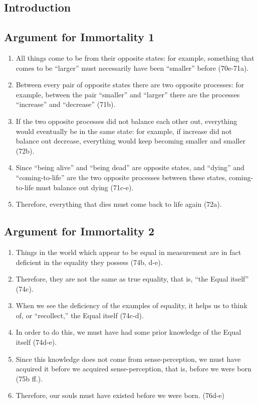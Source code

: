 \documentclass[oneside]{article}
\begin{document}
\thispagestyle{fancy}

\subsection*{Introduction}\label{introduction}

\subsection*{Argument for Immortality 1}


\begin{enumerate}
\item
  All things come to be from their opposite states: for example,
  something that comes to be ``larger'' must necessarily have been
  ``smaller'' before (70e-71a).
\item
  Between every pair of opposite states there are two opposite
  processes: for example, between the pair ``smaller'' and ``larger''
  there are the processes ``increase'' and ``decrease'' (71b).
\item
  If the two opposite processes did not balance each other out,
  everything would eventually be in the same state: for example, if
  increase did not balance out decrease, everything would keep becoming
  smaller and smaller (72b).
\item
  Since ``being alive'' and ``being dead'' are opposite states, and
  ``dying'' and ``coming-to-life'' are the two opposite processes
  between these states, coming-to-life must balance out dying (71c-e).
\item
  Therefore, everything that dies must come back to life again (72a).
\end{enumerate}

\subsection*{Argument for Immortality 2}

\begin{enumerate}
\def\labelenumi{\arabic{enumi}.}
\item
  Things in the world which appear to be equal in measurement are in
  fact deficient in the equality they possess (74b, d-e).
\item
  Therefore, they are not the same as true equality, that is, ``the
  Equal itself'' (74c).
\item
  When we see the deficiency of the examples of equality, it helps us to
  think of, or ``recollect,'' the Equal itself (74c-d).
\item
  In order to do this, we must have had some prior knowledge of the
  Equal itself (74d-e).
\item
  Since this knowledge does not come from sense-perception, we must have
  acquired it before we acquired sense-perception, that is, before we
  were born (75b ff.).
\item
  Therefore, our souls must have existed before we were born. (76d-e)
\end{enumerate}
\end{document}
